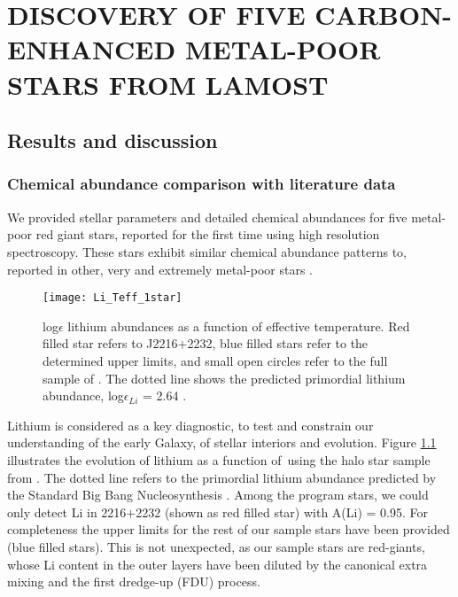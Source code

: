 \chapter{DISCOVERY OF FIVE CARBON-ENHANCED METAL-POOR STARS FROM LAMOST}\label{chap:introduction}




 \section{Results and discussion}\label{sec:discussions}
 
 \subsection{Chemical abundance comparison with literature data}
 
We provided stellar parameters and detailed chemical abundances 
for five metal-poor red giant stars, reported for the first time using high resolution spectroscopy. 
These stars exhibit similar chemical abundance patterns to,
reported in other, very and extremely metal-poor stars \citep[e.g.,][]{2007A&A...476..935F, 2013ApJ...762...26Y}.

\vspace{5mm}
\begin{figure}[!ht]
\centering
\texttt{[image: Li\_Teff\_1star]}
\caption{log$\epsilon$ lithium abundances as a function of effective temperature. Red filled star refers to J2216$+$2232, blue filled stars refer to the determined upper limits, and small open circles 
refer to the full sample of \citet{2014AJ....147..136R}. The dotted line 
shows the predicted primordial lithium abundance, log$\epsilon_{Li}$ = 2.64 \citep{2007ApJS..170..377S}. }
 \label{fig:Li}
\end{figure}

Lithium is considered as a key diagnostic, to test and constrain our understanding of the early Galaxy, of stellar interiors and evolution.
Figure  \ref{fig:Li} illustrates the evolution of lithium as a function of \Teff\,using the halo star sample from \citet[including upper limits]{2014AJ....147..136R}.
The dotted line refers to the primordial lithium abundance predicted by the Standard Big Bang Nucleosynthesis \citep{2007ApJS..170..377S}.
Among the program stars, we could only detect Li in 2216$+$2232 (shown as red filled star) with A(Li) = 0.95. For completeness the upper limits for 
the rest of our sample stars have been provided (blue filled stars). This is not unexpected, as our sample stars are red-giants, whose Li content in the 
outer layers have been diluted by the canonical extra mixing and the first dredge-up (FDU) process.


